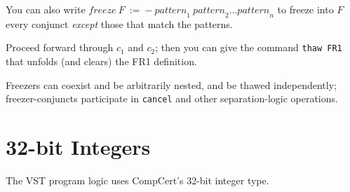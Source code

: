 \documentclass[12pt,fleqn,openany,oneside,showtrims]{memoir}
\newcommand{\ychapter}[2]{\chapter[#1]{#1}}
\begin{document}
You can also write \qquad
$\mathit{freeze}\ F\ \mathsf{:=}\ \mathsf{-}\ \mathit{pattern}_1  ~\mathit{pattern}_2 \ldots \mathit{pattern}_n$ \newline
to freeze into $F$ every conjunct \emph{except} those that match the patterns.


Proceed forward through $c_1$ and $c_2$; then you can give the command
\lstinline{thaw FR1} that unfolds (and clears) the FR1 definition.

Freezers can coexist and be arbitrarily nested, and be thawed independently; freezer-conjuncts participate in \lstinline{cancel} and other separation-logic operations.

\ychapter{32-bit Integers}{(\file{compcert/lib/Integers.v})}
\label{refcard:32bit}

The VST program logic uses CompCert's 32-bit integer type.
\end{document}
